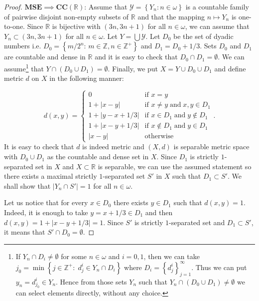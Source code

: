 \documentclass[11pt, reqno]{amsart}
\theoremstyle{definition}
\numberwithin{theorem}{section}
\theoremstyle{definition}
\theoremstyle{definition}
\theoremstyle{definition}
\theoremstyle{definition}
\newcommand{\brac}[1]{\left({#1}\right)}
\theoremstyle{definition}
\numberwithin{claim}{section}
\theoremstyle{definition}
\theoremstyle{definition}
\theoremstyle{definition}
\theoremstyle{definition}
\theoremstyle{definition}
\theoremstyle{remboldstyle}
\begin{document}
\begin{proof}
    $\mathbf{MSE} \implies \textbf{CC}(\mathbb{R})$: Assume that $\mathcal{Y} = \left\{Y_n \colon n \in \omega\right\}$ is a countable family of pairwise disjoint non-empty subsets of $\mathbb{R}$ and that the mapping $n \mapsto Y_n$ is one-to-one. Since $\mathbb{R}$ is bijective with $(3n, 3n+1)$ for all $n \in \omega$, we can assume that $Y_n \subset (3n, 3n+1)$ for all $n \in \omega$. Let $Y = \bigcup \mathcal{Y}$. Let $D_0$ be the set of dyadic numbers i.e. $D_0 = \left\{m/ 2^n \colon\, m \in \mathbb{Z}, n \in \mathbb{Z}^+\right\}$ and $D_1 = D_0  + 1/3$. Sets $D_0$ and $D_1$ are countable and dense in $\mathbb{R}$ and it is easy to check that $D_0 \cap D_1 = \emptyset$. We can assume\footnote{If $Y_n \cap D_i \neq \emptyset$ for some $n \in \omega$ and $i=0, 1$, then we can take $j_0 = \min\left\{j \in \mathbb{Z}^+\colon\; d^i_j \in Y_n \cap D_i\right\}$ where $D_i = \left\{d_j^i\right\}_{j=1}^\infty$. Thus we can put $y_n = d_{j_0}^i \in Y_n$. Hence from those sets $Y_n$ such that $Y_n \cap \brac{D_0 \cup D_1} \neq \emptyset$ we can select elements directly, without any choice.} that $Y \cap \brac{D_0 \cup D_1} = \emptyset$. Finally, we put $X = Y \cup D_0 \cup D_1$ and define metric $d$ on $X$ in the following manner:

 \[
d(x, y) = \begin{cases}
0 & \text{if } x=y\\
1 + |x - y| & \text{if } x\neq y \; \text{and} \; x,y \in D_1 \\
1 + |y - x + 1/3| & \text{if } x \in D_1 \; \text{and} \; y \not\in D_1 \\
1 + |x - y + 1/3| & \text{if } x \not\in D_1 \; \text{and} \; y \in D_1 \\
|x-y| & \text{otherwise}
\end{cases}.
\]
It is easy to check that $d$ is indeed metric and $(X, d)$ is separable metric space with $D_0 \cup D_1$ as the countable and dense set in $X$. Since $D_1$ is strictly $1$-separated set in $X$ and $X \subset \mathbb{R}$ is separable, we can use the assumed statement so there exists a maximal strictly $1$-separated set $S'$ in $X$ such that $D_1 \subset S'$. We shall show that $|Y_n \cap S'| = 1$ for all $n \in \omega$.

Let us notice that for every $x \in D_0$ there exists $y \in D_1$ such that $d(x, y) = 1$. Indeed, it is enough to take $y = x + 1/3 \in D_1$ and then $d(x, y) = 1 + |x - y + 1/3| = 1$. Since $S'$ is strictly $1$-separated set and $D_1 \subset S'$, it means that $S' \cap D_0 = \emptyset$. 


\end{proof}
\end{document}
